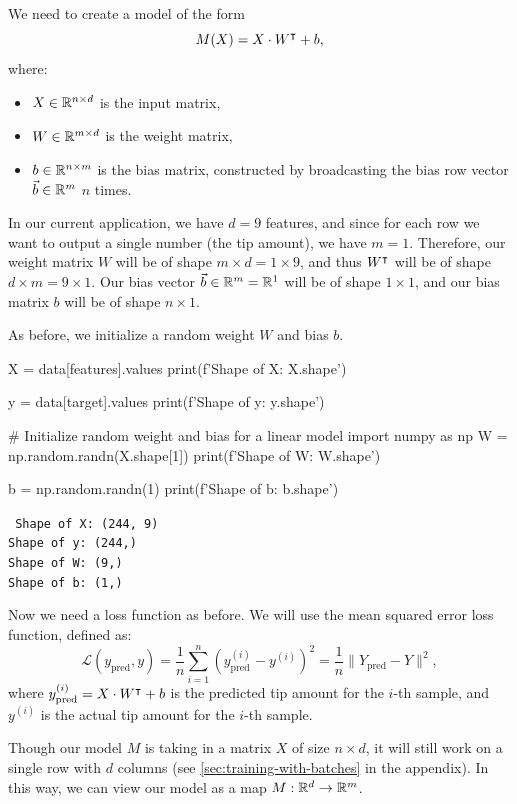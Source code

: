 We need to create a model of the form 
$$M(X) = X\cdot W^\intercal+b,$$
where:
\begin{itemize}
    \item $X\in \mathbb{R}^{n\times d}$ is the input matrix,
    \item $W\in\mathbb{R}^{m\times d}$ is the weight matrix,
    \item $b \in \mathbb{R}^{n\times m}$ is the bias matrix, constructed by broadcasting the bias row vector $\vec{b}\in\mathbb{R}^m$ $n$ times.
\end{itemize}

In our current application, we have $d=9$ features, and since for each row we want to output a single number (the tip amount), we have $m=1$. Therefore, our weight matrix $W$ will be of shape $m\times d = 1\times 9$, and thus $W^\intercal$ will be of shape $d \times m = 9\times 1$. Our bias vector $\vec{b}\in \mathbb{R}^{m}=\mathbb{R}^1$ will be of shape $1\times 1$, and our bias matrix $b$ will be of shape $n\times 1$. 

As before, we initialize a random weight $W$ and bias $b$.

\begin{codeblock}
X = data[features].values
print(f'Shape of X: {X.shape}')

y = data[target].values
print(f'Shape of y: {y.shape}')

# Initialize random weight and bias for a linear model
import numpy as np
W = np.random.randn(X.shape[1])
print(f'Shape of W: {W.shape}')

b = np.random.randn(1)
print(f'Shape of b: {b.shape}')
\end{codeblock}
\texttt{
Shape of X: (244, 9)\\
Shape of y: (244,)\\
Shape of W: (9,)\\
Shape of b: (1,)
}

Now we need a loss function as before. We will use the mean squared error loss function, defined as:
$$\mathcal{L}(y_{\text{pred}},y) = \frac{1}{n}\sum_{i=1}^n (y_{\text{pred}}^{(i)}-y^{(i)})^2 = \frac{1}{n}\|Y_\text{pred} - Y\|^2,$$
where $y_{\text{pred}}^{(i)}=X\cdot W^\intercal + b$ is the predicted tip amount for the $i$-th sample, and $y^{(i)}$ is the actual tip amount for the $i$-th sample.

Though our model $M$ is taking in a matrix $X$ of size $n\times d$, it will still work on a single row with $d$ columns (see \ref{sec:training-with-batches} in the appendix). In this way, we can view our model as a map $M:\mathbb{R}^{d}\to\mathbb{R}^{m}$. 


